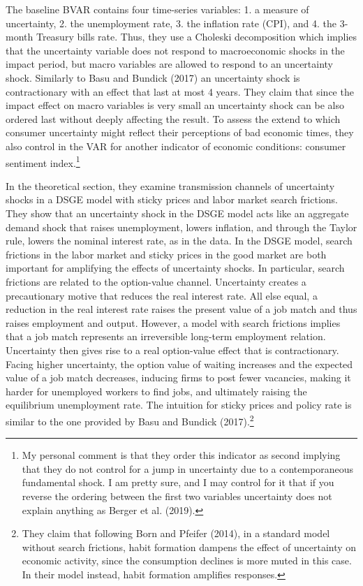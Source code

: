 \documentclass{article}
\begin{document}
{The baseline BVAR contains four time-series variables: 1. a measure of uncertainty, 2. the unemployment rate, 3. the inflation rate (CPI), and 4. the 3-month Treasury bills rate. Thus, they use a Choleski decomposition which implies that the uncertainty variable does not respond to macroeconomic shocks in the impact period, but macro variables are allowed to respond to an uncertainty shock. Similarly to Basu and Bundick (2017) an uncertainty shock is contractionary with an effect that last at most 4 years. They claim that since the impact effect on macro variables is very small an uncertainty shock can be also ordered last without deeply affecting the result. To assess the extend to which consumer uncertainty might reflect their perceptions of bad economic times, they also control in the VAR for another indicator of economic conditions: consumer sentiment index.\footnote{My personal comment is that they order this indicator as second implying that they do not control for a jump in uncertainty due to a contemporaneous fundamental shock. I am pretty sure, and I may control for it that if you reverse the ordering between the first two variables uncertainty does not explain anything as Berger et al. (2019).} 

In the theoretical section, they examine transmission channels of uncertainty shocks in a DSGE model with sticky prices and labor market search frictions. They show that an uncertainty shock in the DSGE model acts like an aggregate demand shock that raises unemployment, lowers inflation, and through the Taylor rule, lowers the nominal interest rate, as in the data. In the DSGE model, search frictions in the labor market and sticky prices in the good market are both important for amplifying the effects of uncertainty shocks. In particular, search frictions are related to the option-value channel. Uncertainty creates a precautionary motive that reduces the real interest rate. All else equal, a reduction in the real interest rate raises the present value of a job match and thus raises employment and output. However, a model with search frictions implies that a job match represents an irreversible long-term employment relation. Uncertainty then gives rise to a real option-value effect that is contractionary. Facing higher uncertainty, the option value of waiting increases and the expected value of a job match decreases, inducing firms to post fewer vacancies, making it harder for unemployed workers to find jobs, and ultimately raising the equilibrium unemployment rate. The intuition for sticky prices and policy rate is similar to the one provided by Basu and Bundick (2017).\footnote{They claim that following Born and Pfeifer (2014), in a standard model without search frictions, habit formation dampens the effect of uncertainty on economic activity, since the consumption declines is more muted in this case. In their model instead, habit formation amplifies responses.}

}
\end{document}
